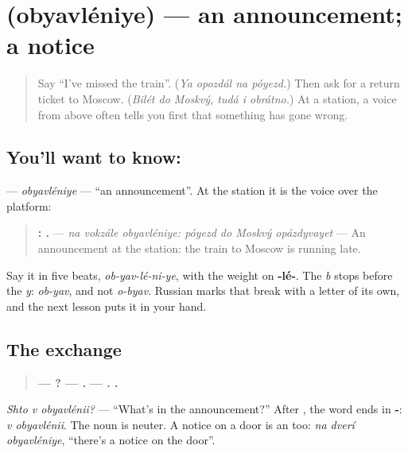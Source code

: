 \section[\texorpdfstring{\ru{объявление} (obyavléniye)}{объявление (obyavléniye)}]{ (obyavléniye) — an announcement; a notice}

\label{lesson:RU-C266-obyavleniye}



\begin{quote}
Say \textquotedblleft{}I've missed the train\textquotedblright{}. (\emph{Ya opozdál na póyezd.}) Then ask for a return ticket to Moscow. (\emph{Bilét do Moskvý, tudá i obrátno.}) At a station, a voice from above often tells you first that something has gone wrong.
\end{quote}

\subsection*{You'll want to know: }
\textbf{} — \emph{obyavléniye} — \textquotedblleft{}an announcement\textquotedblright{}. At the station it is the voice over the platform:

\begin{quote}
\textbf{  :    .} — \emph{na vokzále obyavléniye: póyezd do Moskvý opázdyvayet} — An announcement at the station: the train to Moscow is running late.
\end{quote}

Say it in five beats, \emph{ob-yav-lé-ni-ye}, with the weight on \textbf{-lé-}. The \emph{b} stops before the \emph{y}: \emph{ob-yav}, and not \emph{o-byav}. Russian marks that break with a letter of its own, and the next lesson puts it in your hand.

\subsection*{The exchange}
\begin{quote}
\textbf{—   ? —    .} \textbf{— .    .}
\end{quote}

\emph{Shto v obyavlénii?} — \textquotedblleft{}What's in the announcement?\textquotedblright{} After \textbf{}, the word ends in \textbf{-}: \emph{v obyavlénii}. The noun is neuter. A notice on a door is an \textbf{} too: \emph{na dverí obyavléniye}, \textquotedblleft{}there's a notice on the door\textquotedblright{}.

